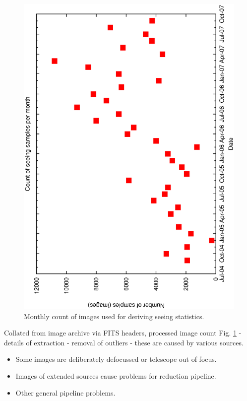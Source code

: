 {{\begin{figure}[htbp]
\begin{center}
    \includegraphics[scale=0.4, angle=-90]{figures/ecs/corr_monthly_bins.eps}
\end{center} 
\caption[Monthly count of images used for deriving seeing statistics.]
{Monthly count of images used for deriving seeing statistics.}
\label{fig:monthly_seeing_count}
\end{figure}


Collated from image archive via FITS headers, processed image count Fig. \ref{fig:monthly_seeing_count} - details of extraction - removal of outliers - these are caused by various sources.
\begin{itemize}
\item Some images are deliberately defocussed or telescope out of focus.
\item Images of extended sources cause problems for reduction pipeline.
\item Other general pipeline problems.
\end{itemize}


}}
